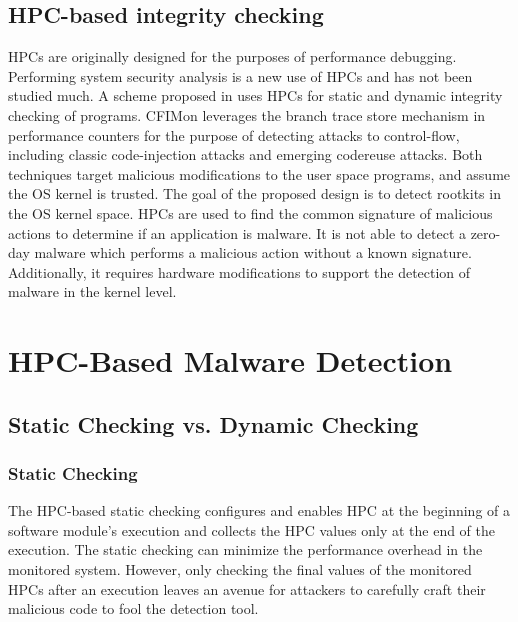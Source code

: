 \documentclass[12pt]{report}
\begin{document}
\section{HPC-based integrity checking}
HPCs are originally designed
for the purposes of performance debugging. Performing
system security analysis is a new use of HPCs and has not been
studied much. A scheme proposed in  uses HPCs for static
and dynamic integrity checking of programs. CFIMon 
leverages the branch trace store mechanism in performance
counters for the purpose of detecting attacks to control-flow,
including classic code-injection attacks and emerging codereuse
attacks. Both techniques target malicious modifications
to the user space programs, and assume the OS kernel is
trusted. The goal of the proposed design is to detect rootkits in the
OS kernel space.  HPCs are used  to find the common
signature of malicious actions to determine if an application
is malware. It is not able to detect a zero-day malware
which performs a malicious action without a known signature.
Additionally, it requires hardware modifications to support the
detection of malware in the kernel level. 

\chapter{HPC-Based Malware Detection}
\section{Static Checking vs. Dynamic Checking}
\subsection{Static Checking}
The HPC-based static checking configures and enables HPC at
the beginning of a software module’s execution and collects the HPC values only at the
end of the execution. The static checking can minimize the performance overhead in
the monitored system. However, only checking the final values of the monitored HPCs
after an execution leaves an avenue for attackers to carefully craft their malicious code
to fool the detection tool.
\end{document}

